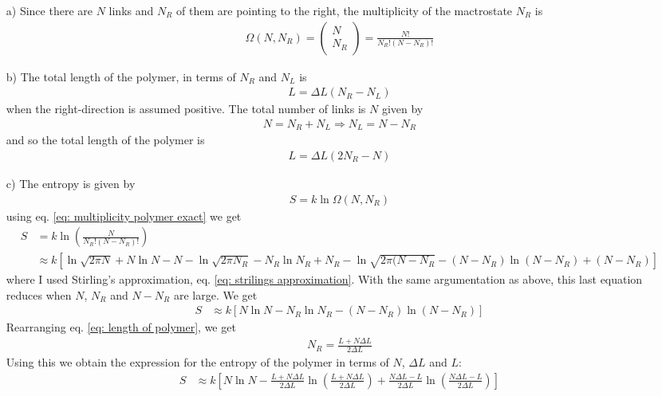 \documentclass[11pt]{article}
\newcounter{excount}
\newenvironment{exercise}[1][]{\addtocounter{excount}{1} \noindent {\bf Exercise
    \arabic{excount} #1}\hspace{2mm}}{\vspace{4mm}}
\begin{document}
\begin{exercise}
	\begin{itemize}
		\item[a)]
			Since there are $N$ links and $N_R$ of them are pointing to the right, the multiplicity of the mactrostate $N_R$ is
			\begin{align}
				\Omega (N,N_R) = \begin{pmatrix}N \\ N_R\end{pmatrix} = \frac{N!}{N_R!(N-N_R)!} \label{eq: multiplicity polymer exact}
			\end{align}
		
		
		
		\item[b)]
			The total length of the polymer, in terms of $N_R$ and $N_L$ is
			\begin{align*}
				L = \Delta L (N_R - N_L)
			\end{align*}
			when the right-direction is assumed positive. The total number of links is $N$ given by
			\begin{align*}
				N = N_R + N_L \Rightarrow N_L = N - N_R
			\end{align*}
			and so the total length of the polymer is
			\begin{align}
				L = \Delta L (2N_R - N) \label{eq: length of polymer}
			\end{align}
		
		
		
		
		
		\item[c)]
			The entropy is given by
			\begin{align*}
				S = k\ln \Omega(N, N_R)
			\end{align*}
			using eq. \eqref{eq: multiplicity polymer exact} we get
			\begin{align*}
				S	&= k\ln\left( \frac{N}{N_R!(N-N_R)!} \right) \\
					&\approx k\left[ \ln \sqrt{2\pi N} + N\ln N - N - \ln \sqrt{2\pi N_R} - N_R \ln N_R + N_R - \ln \sqrt{2\pi(N-N_R} - (N-N_R)\ln (N-N_R) + (N-N_R) \right]
			\end{align*}
			where I used Stirling's approximation, eq. \eqref{eq: strilings approximation}. With the same argumentation as above, this last equation reduces when $N$, $N_R$ and $N-N_R$ are large. We get
			\begin{align}
				S &\approx k\left[ N\ln N - N_R \ln N_R - (N-N_R)\ln (N-N_R) \right] \label{eq: entropy approx polymer S(N_R)}
			\end{align}
			Rearranging eq. \ref{eq: length of polymer}, we get
			\begin{align}
				N_R = \frac{L+N\Delta L}{2\Delta L} \label{eq: N_R polymer}
			\end{align}
			Using this we obtain the expression for the entropy of the polymer in terms of $N$, $\Delta L$ and $L$:
			\begin{align*}
				S &\approx k \left[ N\ln N - \frac{L+N\Delta L}{2\Delta L}\ln \left( \frac{L+N\Delta L}{2\Delta L} \right) + \frac{N\Delta L - L}{2\Delta L} \ln \left( \frac{N\Delta L - L}{2\Delta L} \right)  \right]
			\end{align*}
		

\end{itemize}
\end{exercise}
\end{document}
